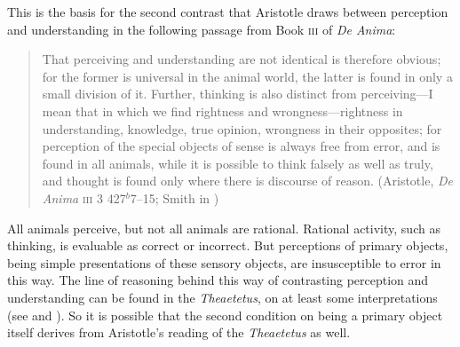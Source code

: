 This is the basis for the second contrast that Aristotle draws between perception and understanding in the following passage from Book \textsc{iii} of \emph{De Anima}:
\begin{quote}
	That perceiving and understanding are not identical is therefore obvious; for the former is universal in the animal world, the latter is found in only a small division of it. Further, thinking is also distinct from perceiving---I mean that in which we find rightness and wrongness---right\-ness in understanding, knowledge, true opinion, wrongness in their opposites; for perception of the special objects of sense is always free from error, and is found in all animals, while it is possible to think falsely as well as truly, and thought is found only where there is discourse of reason. (Aristotle, \emph{De Anima} \textsc{iii} 3 427\( ^{b} \)7--15; Smith in \citealt[49]{Barnes:1984uq})
\end{quote}
All animals perceive, but not all animals are rational. Rational activity, such as thinking, is evaluable as correct or incorrect. But perceptions of primary objects, being simple presentations of these sensory objects, are insusceptible to error in this way. The line of reasoning behind this way of contrasting perception and understanding can be found in the \emph{Theaetetus}, on at least some interpretations (see \citealt{Cooper:1970kx} and \citealt{Burnyeat:1990dp}). So it is possible that the second condition on being a primary object itself derives from Aristotle's reading of the \emph{Theaetetus} as well.

